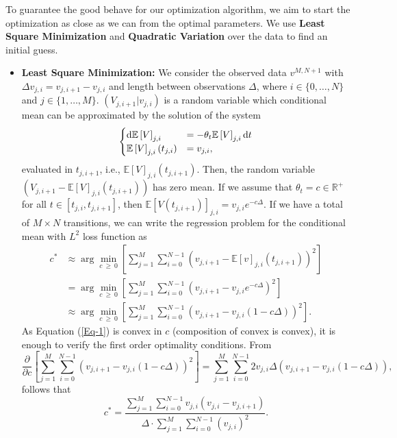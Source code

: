 \documentclass[11pt]{article}
\theoremstyle{definition}
\newcommand{\E}{\mathbb{E}}
\newcommand{\R}{\mathbb{R}}
\begin{document}
To guarantee the good behave for our optimization algorithm, we aim to start the optimization as close as we can from the optimal parameters. We use \textbf{Least Square Minimization} and \textbf{Quadratic Variation} over the data to find an initial guess.

\begin{itemize}

\item \textbf{Least Square Minimization:} We consider the observed data $v^{M,N+1}$ with $\Delta v_{j,i}=v_{j,i+1}-v_{j,i}$ and length between observations $\Delta$, where $i\in\{0,\dots,N\}$ and $j\in\{1,\dots,M\}$. $(V_{j,i+1}|v_{j,i})$ is a random variable which conditional mean can be approximated by the solution of the system
\begin{equation*}
\begin{cases}
\dif \E\left[V\right]_{j,i}&=-\theta_t\E\left[V\right]_{j,i}\dif t\\
\E\left[V\right]_{j,i}(t_{j,i})&=v_{j,i},
\end{cases}
\end{equation*}
evaluated in $t_{j,i+1}$, i.e., $\E\left[V\right]_{j,i}(t_{j,i+1})$. Then, the random variable $(V_{j,i+1}-\E\left[V\right]_{j,i}(t_{j,i+1}))$ has zero mean. If we assume that $\theta_t=c\in\R^+$ for all $t\in[t_{j,i},t_{j,i+1}]$, then $\E\left[V(t_{j,i+1})\right]_{j,i}=v_{j,i}e^{-c\Delta}$. If we have a total of $M\times N$ transitions, we can write the regression problem for the conditional mean with $L^2$ loss function as
\begin{equation}
\begin{split}
c^*&\approx\arg\min_{c\ \geq\ 0}\left[\sum_{j=1}^M\sum_{i=0}^{N-1}\left(v_{j,i+1}-\E\left[v\right]_{j,i}(t_{j,i+1})\right)^2\right]\\
&=\arg\min_{c\ \geq\ 0}\left[\sum_{j=1}^M\sum_{i=0}^{N-1}\left(v_{j,i+1}-v_{j,i}e^{-c\Delta}\right)^2\right]\\
&\approx\arg\min_{c\ \geq\ 0}\left[\sum_{j=1}^M\sum_{i=0}^{N-1}\left(v_{j,i+1}-v_{j,i}(1-c\Delta)\right)^2\right].
\end{split}
\label{Eq-1}
\end{equation}
As Equation (\ref{Eq-1}) is convex in $c$ (composition of convex is convex), it is enough to verify the first order optimality conditions. From
\begin{equation*}
\frac{\partial}{\partial c}\left[\sum_{j=1}^M\sum_{i=0}^{N-1}\left(v_{j,i+1}-v_{j,i}(1-c\Delta)\right)^2\right]=\sum_{j=1}^M\sum_{i=0}^{N-1}2v_{j,i}\Delta\left(v_{j,i+1}-v_{j,i}(1-c\Delta)\right),
\end{equation*}
follows that
\begin{equation}
c^{*}=\frac{\sum_{j=1}^M\sum_{i=0}^{N-1}v_{j,i}(v_{j,i}-v_{j,i+1})}{\Delta\cdot\sum_{j=1}^M\sum_{i=0}^{N-1}(v_{j,i})^2}.
\label{Eq-4}
\end{equation}


\end{itemize}
\end{document}
